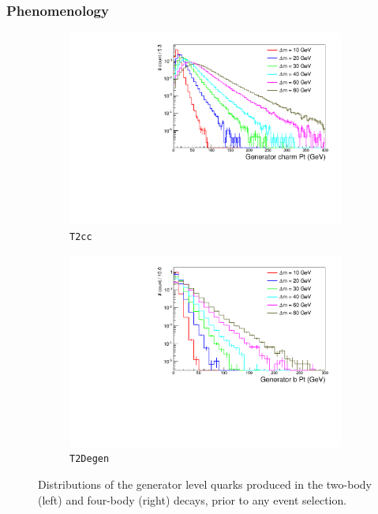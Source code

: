 \subsubsection{Phenomenology}

\begin{figure}[h!]
  \centering
  \begin{subfigure}[b]{0.46\textwidth}
    \includegraphics[width=\textwidth]{Figs/genlevel/compar_charmPt_0_0_inc_inc_T2cc_noCuts_sitv_log.pdf}
    \caption{\texttt{T2cc}}
    \label{fig:t2cc_gen_charm_pt}
  \end{subfigure}
  \begin{subfigure}[b]{0.46\textwidth}
    \includegraphics[width=\textwidth]{Figs/genlevel/compar_T2_4body_genBPt_0_inc_inc_T2_noCuts_sitv_log.pdf}
    \caption{\texttt{T2Degen}}
    \label{fig:t2degen_gen_b_pt}
  \end{subfigure}
  \caption{Distributions of the generator level quarks produced in the two-body
  (left) and four-body (right) decays, prior to any event selection.}
  \label{fig:gen_quark_pt}
\end{figure}

